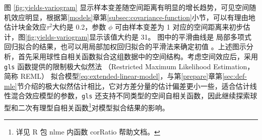 \documentclass[12pt,a4paper,UTF8,twoside]{book}
\theoremstyle{definition}
\theoremstyle{definition}
\theoremstyle{definition}
\theoremstyle{remark}
\begin{document}
图 \ref{fig:yields-variogram}
显示样本变差随空间距离有明显的增长趋势，可见空间随机效应明显，根据第\ref{models}章第\ref{subsec:covariance-function}小节，可以有理由地估计块金效应\(\tau^2\)大约是
0.2，参数 \(\phi\) 可由样本变差为 1
对应的空间距离来初步估计，图\ref{fig:yields-variogram}显示该值大约是
31。 图中的平滑曲线是
局部多项式回归拟合的结果，也可以用局部加权回归拟合的平滑法来确定初值
\citep{Xie2008COS}。上述图示分析，首先采用球性自相关函数拟合这组数据中的空间结构。考虑空间效应后，采用
\texttt{gls} 函数提供的限制极大似然法 （Restricted Maximum Likelihood
Estimation， 简称 REML）
拟合模型\eqref{eq:extended-linear-model}，与第\ref{prepare}章第\ref{sec:def-mle}节介绍的极大似然估计相比，它对方差分量的估计偏差更小一些\citep{Diggle2007}，适合估计线性混合效应模型的参数，\texttt{gls}
还支持不同类型的空间自相关函数，因此继续探索球型和二次有理型自相关函数\footnote{详见 R 包 nlme 内函数 corRatio 帮助文档。}对模型拟合结果的影响。
\end{document}
